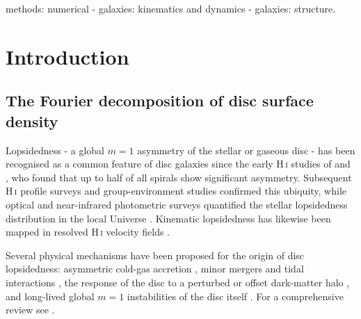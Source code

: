 \documentclass[fleqn,usenatbib]{mnras}
\begin{document}
\begin{keywords}
methods: numerical - galaxies: kinematics and dynamics -
galaxies: structure.
\end{keywords}


\section{Introduction}
\label{sec:intro}

\subsection{The Fourier decomposition of disc surface density}
Lopsidedness - a global $m=1$ asymmetry of the stellar or gaseous
disc - has been recognised as a common feature of disc galaxies
since the early H\,\textsc{i} studies of \citet{1980MNRAS.193..313B} and
\citet{1994A&A...290L...9R}, who found that up to half of all
spirals show significant asymmetry.  Subsequent H\,\textsc{i}
profile surveys \citep{1998AJ....115...62H,1998AJ....116.1169M} and group-environment
studies \citep{2006MNRAS.369.1849A} confirmed this ubiquity, while
optical and near-infrared photometric surveys quantified the stellar
lopsidedness distribution in the local Universe
\citep{1995ApJ...447...82R,1997ApJ...477..118Z,2008ApJ...677..186R,2009ApJ...691.1005R,2013ApJ...772..135Z}.
Kinematic lopsidedness has likewise been mapped in resolved
H\,\textsc{i} velocity fields \citep{2011A&A...530A..29V}.

Several physical mechanisms have been proposed for the origin of
disc lopsidedness: asymmetric cold-gas accretion
\citep{1997ApJ...488..642J,2005A&A...438..507B,2008A&ARv..15..189S}, minor mergers and
tidal interactions \citep{1995ApJ...448...41H,1996ApJ...460..121W},
the response of the disc to a perturbed or offset dark-matter halo
\citep{1994ApJ...420..597W,1998ApJ...496L..13L,2001MNRAS.328.1064N,2002ApJ...568..190I},
and long-lived global $m=1$ instabilities of the disc itself
\citep{2007MNRAS.382..419S,2008MNRAS.387....2D}.  For a comprehensive review see
\citet{2009PhR...471...75J}.
\end{document}
